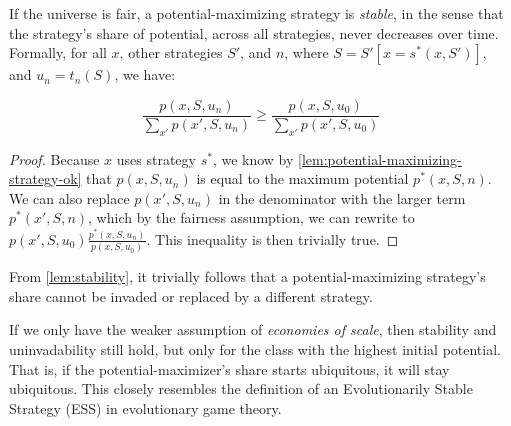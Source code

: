 \begin{theorem}
  \label{lem:stability}
  If the universe is fair,
  a potential-maximizing strategy is \emph{stable}, in the sense that the
  strategy's share of potential, across all strategies, never decreases over
  time. Formally, for all $x$, other strategies $S'$, and $n$, where $S =
    S'[x = s^*(x,S')]$, and $u_n = t_n(S)$, we have:

  \begin{equation}
    \frac{p(x,S,u_n)}{\sum_{x'} p(x',S,u_n)} \ge \frac{p(x,S,u_0)}{\sum_{x'} p(x',S,u_0)}
  \end{equation}
\end{theorem}

\begin{proof}
  Because $x$ uses strategy $s^*$, we know by
  \cref{lem:potential-maximizing-strategy-ok} that $p(x,S,u_n)$ is equal to the
  maximum potential $p^*(x,S,n)$. We can also replace $p(x',S,u_n)$ in the denominator
  with the larger term $p^*(x',S,n)$, which by the fairness assumption, we
  can rewrite to $p(x',S,u_0) \frac{p^*(x,S,u_n)}{p(x,S,u_0)}$.
  This inequality is then trivially true.
\end{proof}

From \cref{lem:stability}, it trivially follows that a potential-maximizing
strategy's share cannot be invaded or replaced by a different strategy.

If we only have the weaker assumption of \emph{economies of scale}, then
stability and uninvadability still hold, but only for the class with the highest
initial potential. That is, if the potential-maximizer's share starts ubiquitous,
it will stay ubiquitous. This closely resembles the definition of an
Evolutionarily Stable Strategy (ESS) in evolutionary game theory.
